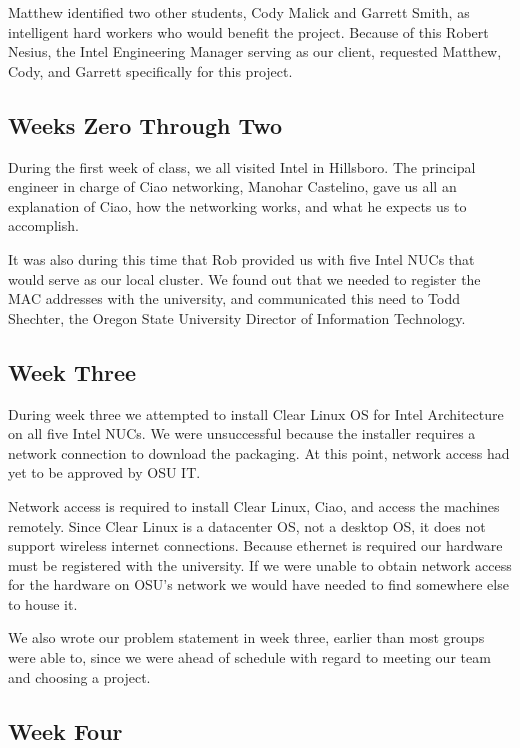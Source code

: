 \documentclass[10pt,onecolumn,journal,draftclsnofoot]{IEEEtran}
\begin{document}
Matthew identified two other students, Cody Malick and Garrett Smith, as
intelligent hard workers who would benefit the project. Because of this Robert
Nesius, the Intel Engineering Manager serving as our client, requested Matthew,
Cody, and Garrett specifically for this project.

\subsection{Weeks Zero Through Two}

During the first week of class, we all visited Intel in Hillsboro. The principal
engineer in charge of Ciao networking, Manohar Castelino, gave us all an
explanation of Ciao, how the networking works, and what he expects us to
accomplish.

It was also during this time that Rob provided us with five Intel NUCs that
would serve as our local cluster. We found out that we needed to register the
MAC addresses with the university, and communicated this need to Todd Shechter,
the Oregon State University Director of Information Technology.

\subsection{Week Three}

During week three we attempted to install Clear Linux OS for Intel
Architecture~\cite{clearlinux} on all five Intel NUCs. We were unsuccessful
because the installer requires a network connection to download the packaging.
At this point, network access had yet to be approved by OSU IT.

Network access is required to install Clear Linux, Ciao, and access the machines
remotely. Since Clear Linux is a datacenter OS, not a desktop OS, it does not
support wireless internet connections. Because ethernet is required our hardware
must be registered with the university. If we were unable to obtain network
access for the hardware on OSU's network we would have needed to find somewhere
else to house it.

We also wrote our problem statement in week three, earlier than most groups were
able to, since we were ahead of schedule with regard to meeting our team and
choosing a project.

\subsection{Week Four}
\end{document}
